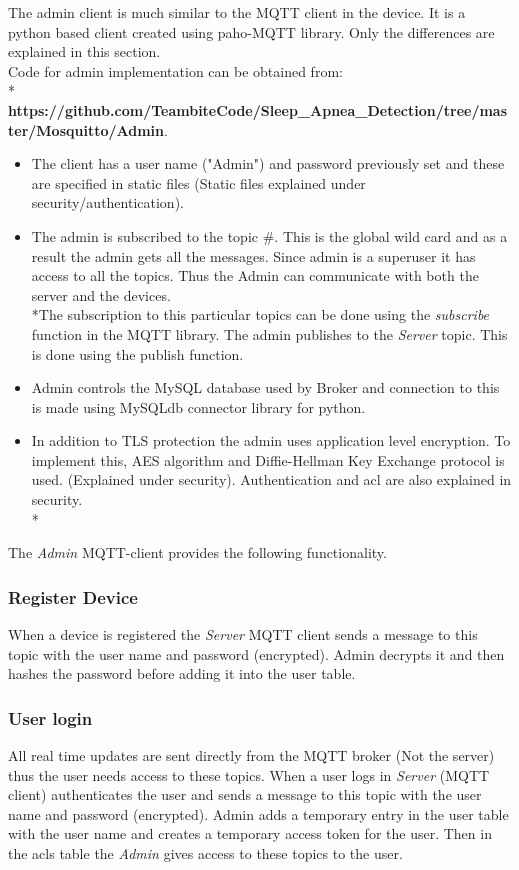 \documentclass{report}
\begin{document}
The admin client is much similar to the MQTT client in the device. It is a python based client created using paho-MQTT library. Only the  differences are explained in this section.\\
Code for admin implementation can be obtained from:\\*
\textbf{https://github.com/TeambiteCode/Sleep\_Apnea\_Detection/tree/master/Mosquitto/Admin}.\\

\begin{itemize}
    \item The client has a user name ("Admin") and password previously set and these are specified in static files (Static files explained under security/authentication).
    \item The admin is subscribed to the topic #. This is the global wild card and as a result the admin gets all the messages. Since admin is a superuser it has access to all the topics. Thus the Admin can communicate with both the server and the devices.\\*The subscription to this particular topics can be done using the \textit{subscribe} function in the MQTT library. The admin publishes to the \textit{Server} topic. This is done using the publish function.
    \item Admin controls the MySQL database used by Broker and connection to this is made using MySQLdb connector library for python.
    \item In addition to TLS protection the admin uses application level encryption. To implement this, AES algorithm and Diffie-Hellman Key Exchange protocol is used. (Explained under security). Authentication and acl are also explained in security.\\*

\end{itemize}

The \textit{Admin} MQTT-client provides the following functionality.

\subsubsection{Register Device}
When a device is registered the \textit{Server} MQTT client sends a message to this topic with the user name and password (encrypted). Admin decrypts it and then hashes the password before adding it into the user table.

\subsubsection{User login}
All real time updates are sent directly from the MQTT broker (Not the server) thus the user needs access to these topics. When a user logs in \textit{Server} (MQTT client) authenticates the user and  sends a message to this topic with the user name and password (encrypted). Admin adds a temporary entry in the user table with the user name and creates a temporary access token for the user. Then in the acls table the \textit{Admin} gives access to these topics to the user.\\
\end{document}
